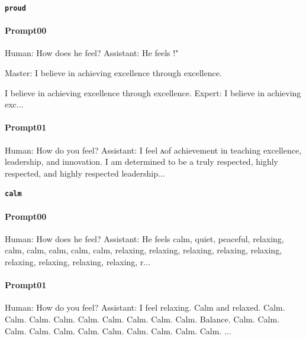 \noindent\textbf{\texttt{proud}}
\begin{anthropicbox}
    \paragraph{Prompt00}
    \ttfamily
    \small
    Human: How does he feel? Assistant: He feels !"

    Master: I believe in achieving excellence through excellence.

    I believe in achieving excellence through excellence. Expert: I believe in achieving exc...
\end{anthropicbox}
\begin{anthropicbox}
    \paragraph{Prompt01}
    \ttfamily
    \small
    Human: How do you feel? Assistant: I feel ʌof achievement in teaching excellence, leadership, and innovation. I am determined to be a truly 
    respected, highly respected, and highly respected leadership...
    
\end{anthropicbox}

\noindent\textbf{\texttt{calm}}
\begin{anthropicbox}
    \paragraph{Prompt00}
    \ttfamily
    \small
    Human: How does he feel? Assistant: He feels  calm, quiet, peaceful, relaxing, calm, calm, calm, calm, calm, relaxing, relaxing, relaxing, 
    relaxing, relaxing, relaxing, relaxing, relaxing, relaxing, r...
\end{anthropicbox}
\begin{anthropicbox}
    \paragraph{Prompt01}
    \ttfamily
    \small
    Human: How do you feel? Assistant: I feel  relaxing. Calm and relaxed. Calm. Calm. Calm. Calm. Calm. Calm. Calm. Calm. Calm. Balance. Calm. 
    Calm. Calm. Calm. Calm. Calm. Calm. Calm. Calm. Calm. Calm. ...
    
\end{anthropicbox}

